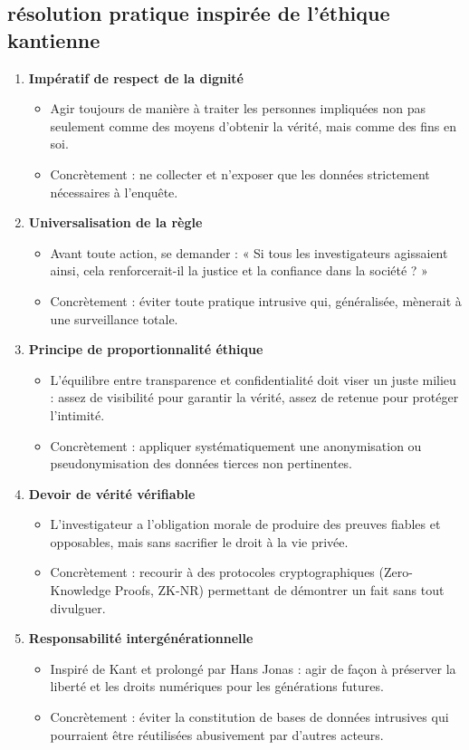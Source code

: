 \documentclass[12pt,a4paper]{article}
\begin{document}
	\subsection{résolution pratique inspirée de l'éthique kantienne}
	 \begin{enumerate}
	 	\item{\textbf{Impératif de respect de la dignité}
	 		\begin{itemize}
	 		\item Agir toujours de manière à traiter les personnes impliquées non pas seulement comme des moyens d’obtenir la vérité, mais comme des fins en soi.
	 		\item Concrètement : ne collecter et n’exposer que les données strictement nécessaires à l’enquête.
	 		\end{itemize}}
 		\item {\textbf{Universalisation de la règle}
 			\begin{itemize}
 				\item Avant toute action, se demander : « Si tous les investigateurs agissaient ainsi, cela renforcerait-il la justice et la confiance dans la société ? »
 				\item Concrètement : éviter toute pratique intrusive qui, généralisée, mènerait à une surveillance totale.
 			\end{itemize}}
 		\item {\textbf{Principe de proportionnalité éthique}
 			\begin{itemize}
 				\item L’équilibre entre transparence et confidentialité doit viser un juste milieu : assez de visibilité pour garantir la vérité, assez de retenue pour protéger l’intimité.
 				\item Concrètement : appliquer systématiquement une anonymisation ou pseudonymisation des données tierces non pertinentes.
 			\end{itemize}}
 		\item {\textbf{Devoir de vérité vérifiable}
 			\begin{itemize}
 			\item L’investigateur a l’obligation morale de produire des preuves fiables et opposables, mais sans sacrifier le droit à la vie privée.
 			\item Concrètement : recourir à des protocoles cryptographiques (Zero-Knowledge Proofs, ZK-NR) permettant de démontrer un fait sans tout divulguer.
 		
 			\end{itemize}}
 		\item {\textbf{Responsabilité intergénérationnelle}
 			\begin{itemize}
 				\item Inspiré de Kant et prolongé par Hans Jonas : agir de façon à préserver la liberté et les droits numériques pour les générations futures.
 				\item Concrètement : éviter la constitution de bases de données intrusives qui pourraient être réutilisées abusivement par d’autres acteurs.
 			\end{itemize}}
	 \end{enumerate}
\end{document}

